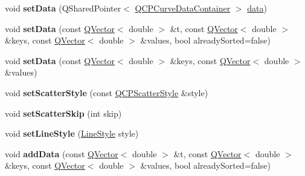 \begin{DoxyCompactItemize}
\item 
void {\bfseries set\+Data} (Q\+Shared\+Pointer$<$ \hyperlink{class_q_c_p_data_container}{Q\+C\+P\+Curve\+Data\+Container} $>$ \hyperlink{class_q_c_p_curve_ad89c71fdd1726506c21c0cc471547368}{data})\hypertarget{class_q_c_p_curve_a41246850d2e080bc57183ca19cd4135e}{}\label{class_q_c_p_curve_a41246850d2e080bc57183ca19cd4135e}

\item 
void {\bfseries set\+Data} (const \hyperlink{class_q_vector}{Q\+Vector}$<$ double $>$ \&t, const \hyperlink{class_q_vector}{Q\+Vector}$<$ double $>$ \&keys, const \hyperlink{class_q_vector}{Q\+Vector}$<$ double $>$ \&values, bool already\+Sorted=false)\hypertarget{class_q_c_p_curve_a0768af2c33c8dcffa3cf5bdeb53923a6}{}\label{class_q_c_p_curve_a0768af2c33c8dcffa3cf5bdeb53923a6}

\item 
void {\bfseries set\+Data} (const \hyperlink{class_q_vector}{Q\+Vector}$<$ double $>$ \&keys, const \hyperlink{class_q_vector}{Q\+Vector}$<$ double $>$ \&values)\hypertarget{class_q_c_p_curve_a9d3245d43304226e013240c94802f7f6}{}\label{class_q_c_p_curve_a9d3245d43304226e013240c94802f7f6}

\item 
void {\bfseries set\+Scatter\+Style} (const \hyperlink{class_q_c_p_scatter_style}{Q\+C\+P\+Scatter\+Style} \&style)\hypertarget{class_q_c_p_curve_a55e43b44709bf50a35500644988aa706}{}\label{class_q_c_p_curve_a55e43b44709bf50a35500644988aa706}

\item 
void {\bfseries set\+Scatter\+Skip} (int skip)\hypertarget{class_q_c_p_curve_a97dbfecd497e972d5f2162615e6da5be}{}\label{class_q_c_p_curve_a97dbfecd497e972d5f2162615e6da5be}

\item 
void {\bfseries set\+Line\+Style} (\hyperlink{class_q_c_p_curve_a2710e9f79302152cff794c6e16cc01f1}{Line\+Style} style)\hypertarget{class_q_c_p_curve_a4a377ec863ff81a1875c3094a6177c19}{}\label{class_q_c_p_curve_a4a377ec863ff81a1875c3094a6177c19}

\item 
void {\bfseries add\+Data} (const \hyperlink{class_q_vector}{Q\+Vector}$<$ double $>$ \&t, const \hyperlink{class_q_vector}{Q\+Vector}$<$ double $>$ \&keys, const \hyperlink{class_q_vector}{Q\+Vector}$<$ double $>$ \&values, bool already\+Sorted=false)\hypertarget{class_q_c_p_curve_a73edf394b94f3f24f07518e30565a07f}{}\label{class_q_c_p_curve_a73edf394b94f3f24f07518e30565a07f}


\end{DoxyCompactItemize}
